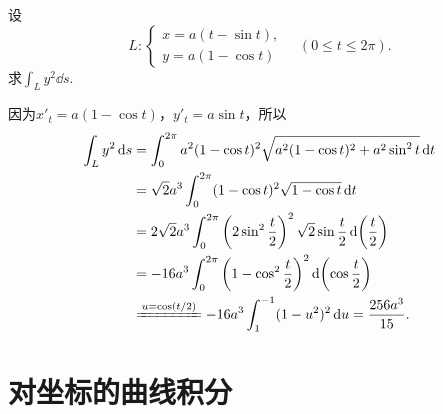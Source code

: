 \begin{example}
设\[
L: \left\{ \begin{array}{l}
x = a(t - \sin t), \\
y = a(1 - \cos t)
\end{array} \right.
\quad(0 \leqslant t \leqslant 2\pi).
\]求\(\int_L y^2 \dd{s}\).
\begin{solution}
因为\(x'_t = a(1 - \cos t)\)，\(y'_t = a \sin t\)，所以\begin{align*}
\int_L y^2 \dd{s}
&= \int_0^{2\pi} a^2(1 - \cos t)^2 \sqrt{a^2(1 - \cos t)^2 + a^2 \sin^2 t} \dd{t} \\
&= \sqrt{2} a^3 \int_0^{2\pi} (1 - \cos t)^2 \sqrt{1 - \cos t} \dd{t} \\
&= 2\sqrt{2} a^3 \int_0^{2\pi}
 \left(2 \sin^2 \frac{t}{2}\right)^2 \sqrt{2} \sin\frac{t}{2} \dd(\frac{t}{2}) \\
&= -16 a^3 \int_0^{2\pi} \left(1 - \cos^2 \frac{t}{2}\right)^2 \dd(\cos\frac{t}{2}) \\
&\xlongequal{u=\cos(t/2)}
-16a^3 \int_1^{-1} (1-u^2)^2 \dd{u}
= \frac{256a^3}{15}.
\end{align*}
\end{solution}
\end{example}

\section{对坐标的曲线积分}
